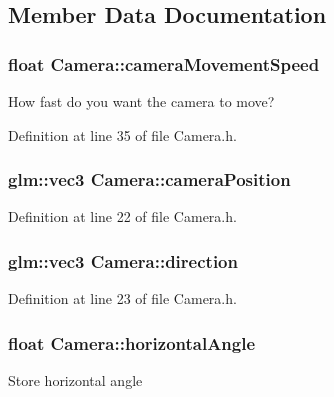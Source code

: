 \subsection{Member Data Documentation}
\hypertarget{class_camera_a0ca21737f5a9fb6a9fda61e7e92c9a5e}{}
\subsubsection[{camera\+Movement\+Speed}]{\setlength{\rightskip}{0pt plus 5cm}float Camera\+::camera\+Movement\+Speed\hspace{0.3cm}{\ttfamily [private]}}\label{class_camera_a0ca21737f5a9fb6a9fda61e7e92c9a5e}
How fast do you want the camera to move? 

Definition at line 35 of file Camera.\+h.

\hypertarget{class_camera_aca1334c1a10c3a1fe84a2979b205ff9a}{}
\subsubsection[{camera\+Position}]{\setlength{\rightskip}{0pt plus 5cm}glm\+::vec3 Camera\+::camera\+Position\hspace{0.3cm}{\ttfamily [private]}}\label{class_camera_aca1334c1a10c3a1fe84a2979b205ff9a}


Definition at line 22 of file Camera.\+h.

\hypertarget{class_camera_aa91491698db51f70c62199d8c2213514}{}
\subsubsection[{direction}]{\setlength{\rightskip}{0pt plus 5cm}glm\+::vec3 Camera\+::direction\hspace{0.3cm}{\ttfamily [private]}}\label{class_camera_aa91491698db51f70c62199d8c2213514}


Definition at line 23 of file Camera.\+h.

\hypertarget{class_camera_aad9d573147be409e929251eca0bea339}{}
\subsubsection[{horizontal\+Angle}]{\setlength{\rightskip}{0pt plus 5cm}float Camera\+::horizontal\+Angle\hspace{0.3cm}{\ttfamily [private]}}\label{class_camera_aad9d573147be409e929251eca0bea339}
Store horizontal angle 

